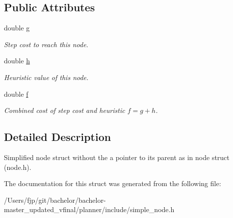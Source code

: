 \subsection*{Public Attributes}
\begin{DoxyCompactItemize}
\item 
\mbox{\label{structplanner_1_1t_simple_node_aa75a8701dd9f556dee00365465aa21b5}} 
double \mbox{\hyperlink{structplanner_1_1t_simple_node_aa75a8701dd9f556dee00365465aa21b5}{g}}
\begin{DoxyCompactList}\small\item\em Step cost to reach this node. \end{DoxyCompactList}\item 
\mbox{\label{structplanner_1_1t_simple_node_ae094d2027225ecdf4d5adc27177a9daa}} 
double \mbox{\hyperlink{structplanner_1_1t_simple_node_ae094d2027225ecdf4d5adc27177a9daa}{h}}
\begin{DoxyCompactList}\small\item\em Heuristic value of this node. \end{DoxyCompactList}\item 
\mbox{\label{structplanner_1_1t_simple_node_a3411f599ba06ac5373746571ac5223e6}} 
double \mbox{\hyperlink{structplanner_1_1t_simple_node_a3411f599ba06ac5373746571ac5223e6}{f}}
\begin{DoxyCompactList}\small\item\em Combined cost of step cost and heuristic $f = g + h$. \end{DoxyCompactList}\end{DoxyCompactItemize}


\subsection{Detailed Description}
Simplified node struct without the a pointer to its parent as in node struct (node.\+h). 

The documentation for this struct was generated from the following file\+:\begin{DoxyCompactItemize}
\item 
/\+Users/fjp/git/bachelor/bachelor-\/master\+\_\+updated\+\_\+vfinal/planner/include/simple\+\_\+node.\+h\end{DoxyCompactItemize}
